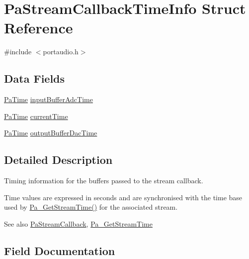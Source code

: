 \hypertarget{struct_pa_stream_callback_time_info}{}\section{Pa\+Stream\+Callback\+Time\+Info Struct Reference}
\label{struct_pa_stream_callback_time_info}


{\ttfamily \#include $<$portaudio.\+h$>$}

\subsection*{Data Fields}
\begin{DoxyCompactItemize}
\item 
\hyperlink{portaudio_8h_af17a7e6d0471a23071acf8dbd7bbe4bd}{Pa\+Time} \hyperlink{struct_pa_stream_callback_time_info_a747ae151e0fbd441174e7bc883798b32}{input\+Buffer\+Adc\+Time}
\item 
\hyperlink{portaudio_8h_af17a7e6d0471a23071acf8dbd7bbe4bd}{Pa\+Time} \hyperlink{struct_pa_stream_callback_time_info_a26d1a68376a51e28163a042e51932c83}{current\+Time}
\item 
\hyperlink{portaudio_8h_af17a7e6d0471a23071acf8dbd7bbe4bd}{Pa\+Time} \hyperlink{struct_pa_stream_callback_time_info_a476879b92afeab8bfb02f508607a8109}{output\+Buffer\+Dac\+Time}
\end{DoxyCompactItemize}


\subsection{Detailed Description}
Timing information for the buffers passed to the stream callback.

Time values are expressed in seconds and are synchronised with the time base used by \hyperlink{portaudio_8h_a2b3fb60e6949f37f7f134105ff425749}{Pa\+\_\+\+Get\+Stream\+Time()} for the associated stream.

\begin{DoxySeeAlso}{See also}
\hyperlink{portaudio_8h_a8a60fb2a5ec9cbade3f54a9c978e2710}{Pa\+Stream\+Callback}, \hyperlink{portaudio_8h_a2b3fb60e6949f37f7f134105ff425749}{Pa\+\_\+\+Get\+Stream\+Time} 
\end{DoxySeeAlso}


\subsection{Field Documentation}
\mbox{\label{struct_pa_stream_callback_time_info_a26d1a68376a51e28163a042e51932c83}} 
